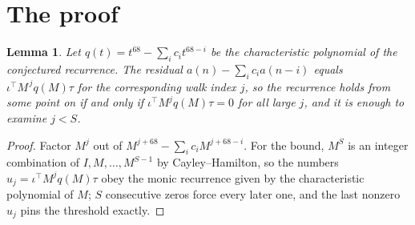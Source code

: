 \documentclass[11pt,a4paper]{article}
\theoremstyle{plain}
\newtheorem{lemma}[theorem]{Lemma}
\theoremstyle{definition}
\begin{document}
\section{The proof}

\begin{lemma}\label{lem:crit}
Let $q(t)=t^{68}-\sum_i c_it^{68-i}$ be the characteristic polynomial of the
conjectured recurrence. The residual $a(n)-\sum_ic_ia(n-i)$ equals
$\iota^{\!\top}M^{\,j}q(M)\tau$ for the corresponding walk index $j$, so the recurrence
holds from some point on if and only if $\iota^{\!\top}M^{j}q(M)\tau=0$ for all large $j$,
and it is enough to examine $j<S$.
\end{lemma}

\begin{proof}
Factor $M^{j}$ out of $M^{j+68}-\sum_ic_iM^{j+68-i}$. For the bound, $M^{S}$
is an integer combination of $I,M,\dots,M^{S-1}$ by Cayley--Hamilton, so the numbers
$u_j=\iota^{\!\top}M^{j}q(M)\tau$ obey the monic recurrence given by the characteristic
polynomial of $M$; $S$ consecutive zeros force every later one, and the last nonzero $u_j$
pins the threshold exactly.
\end{proof}
\end{document}
